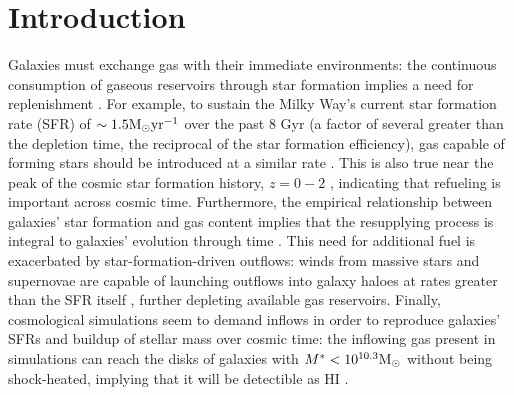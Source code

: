 \section{Introduction}
\label{sec:intro}


Galaxies must exchange gas with their immediate environments: the continuous consumption of gaseous reservoirs through star formation implies a need for replenishment \citep{kennicutt_evans_2012_sf-review}. For example, to sustain the Milky Way's current star formation rate (SFR) of $\sim 1.5 {\rm M_{\odot} yr^{-1}}$ over the past 8 Gyr (a factor of several greater than the depletion time, the reciprocal of the star formation efficiency), gas capable of forming stars should be introduced at a similar rate \citep{snaith_2015_mw-sfr, licquia_newman_2015_mw}. This is also true near the peak of the cosmic star formation history, $z=0-2$ \citep{tacconi_2013}, indicating that refueling is important across cosmic time. Furthermore, the empirical relationship between galaxies' star formation and gas content implies that the resupplying process is integral to galaxies' evolution through time \citep{kennicutt_1998}. This need for additional fuel is exacerbated by star-formation-driven outflows: winds from massive stars and supernovae are capable of launching outflows into galaxy haloes at rates greater than the SFR itself \citep{heckman_1990_outflows, rubin_2014_outflows, chisholm_18_outflows}, further depleting available gas reservoirs. Finally, cosmological simulations seem to demand inflows in order to reproduce galaxies' SFRs and buildup of stellar mass over cosmic time: the inflowing gas present in simulations can reach the disks of galaxies with $M^* < 10^{10.3} {\rm M_{\odot}}$ without being shock-heated, implying that it will be detectible as HI \citep{keres_2005_cold-accretion, dekel_birnboim_06_cold-accretion}.

